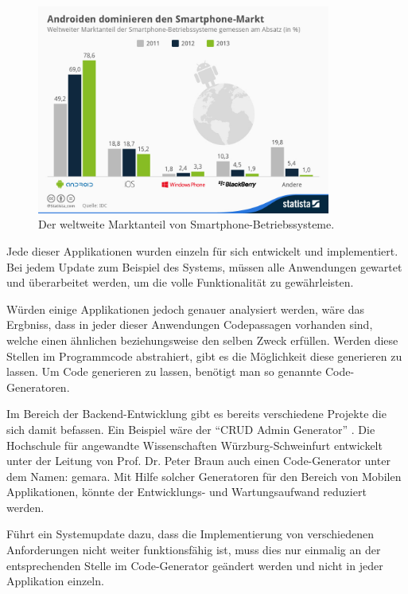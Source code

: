 \begin{figure}[H]
	\begin{center}
		\includegraphics[width=0.86\textwidth]{images/os.jpg}
		\caption{Der weltweite Marktanteil von Smartphone-Betriebssysteme. \cite{os}}
		\label{fig:os_fig}
	\end{center}
\end{figure}

Jede dieser Applikationen wurden einzeln für sich entwickelt und implementiert. Bei jedem Update zum Beispiel des Systems, müssen alle Anwendungen gewartet und überarbeitet werden, um die volle Funktionalität zu gewährleisten.

Würden einige Applikationen jedoch genauer analysiert werden, wäre das Ergbniss, dass in jeder dieser Anwendungen Codepassagen vorhanden sind, welche einen ähnlichen beziehungsweise den selben Zweck erfüllen. Werden diese Stellen im Programmcode abstrahiert, gibt es die Möglichkeit diese generieren zu lassen. Um Code generieren zu lassen, benötigt man so genannte Code-Generatoren. 

Im Bereich der Backend-Entwicklung gibt es bereits verschiedene Projekte die sich damit befassen. Ein Beispiel wäre der \enquote{CRUD Admin Generator} \cite{generators}. Die Hochschule für angewandte Wissenschaften Würzburg-Schweinfurt entwickelt  unter der Leitung von Prof. Dr. Peter Braun auch einen Code-Generator unter dem Namen: \ac{gemara}. Mit Hilfe solcher Generatoren für den Bereich von Mobilen Applikationen, könnte der Entwicklungs- und Wartungsaufwand reduziert werden. 

Führt ein Systemupdate dazu, dass die Implementierung von verschiedenen Anforderungen nicht weiter funktionsfähig ist, muss dies nur einmalig an der entsprechenden Stelle im Code-Generator geändert werden und nicht in jeder Applikation einzeln. 

